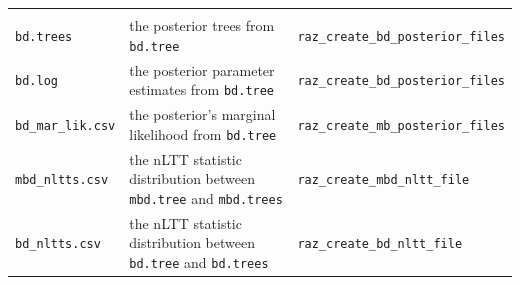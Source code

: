 \documentclass[]{article}
\begin{document}
\begin{longtable}[]{@{}lll@{}}
\begin{minipage}[t]{0.30\columnwidth}
\end{minipage}\tabularnewline
\begin{minipage}[t]{0.16\columnwidth}\raggedright\strut
\texttt{bd.trees}\strut
\end{minipage} & \begin{minipage}[t]{0.45\columnwidth}\raggedright\strut
the posterior trees from \texttt{bd.tree}\strut
\end{minipage} & \begin{minipage}[t]{0.30\columnwidth}\raggedright\strut
\texttt{raz\_create\_bd\_posterior\_files}\strut
\end{minipage}\tabularnewline
\begin{minipage}[t]{0.16\columnwidth}\raggedright\strut
\texttt{bd.log}\strut
\end{minipage} & \begin{minipage}[t]{0.45\columnwidth}\raggedright\strut
the posterior parameter estimates from \texttt{bd.tree}\strut
\end{minipage} & \begin{minipage}[t]{0.30\columnwidth}\raggedright\strut
\texttt{raz\_create\_bd\_posterior\_files}\strut
\end{minipage}\tabularnewline
\begin{minipage}[t]{0.16\columnwidth}\raggedright\strut
\texttt{bd\_mar\_lik.csv}\strut
\end{minipage} & \begin{minipage}[t]{0.45\columnwidth}\raggedright\strut
the posterior's marginal likelihood from \texttt{bd.tree}\strut
\end{minipage} & \begin{minipage}[t]{0.30\columnwidth}\raggedright\strut
\texttt{raz\_create\_mb\_posterior\_files}\strut
\end{minipage}\tabularnewline
\begin{minipage}[t]{0.16\columnwidth}\raggedright\strut
\texttt{mbd\_nltts.csv}\strut
\end{minipage} & \begin{minipage}[t]{0.45\columnwidth}\raggedright\strut
the nLTT statistic distribution between \texttt{mbd.tree} and
\texttt{mbd.trees}\strut
\end{minipage} & \begin{minipage}[t]{0.30\columnwidth}\raggedright\strut
\texttt{raz\_create\_mbd\_nltt\_file}\strut
\end{minipage}\tabularnewline
\begin{minipage}[t]{0.16\columnwidth}\raggedright\strut
\texttt{bd\_nltts.csv}\strut
\end{minipage} & \begin{minipage}[t]{0.45\columnwidth}\raggedright\strut
the nLTT statistic distribution between \texttt{bd.tree} and
\texttt{bd.trees}\strut
\end{minipage} & \begin{minipage}[t]{0.30\columnwidth}\raggedright\strut
\texttt{raz\_create\_bd\_nltt\_file}\strut
\end{minipage}\tabularnewline
\bottomrule
\end{longtable}
\end{document}
